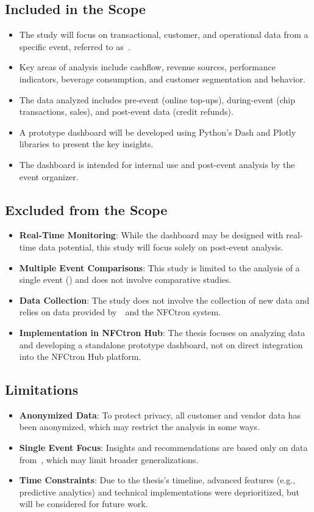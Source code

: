 \subsection*{Included in the Scope}
\label{subsec:introduction-scope-included}
\begin{itemize}
	\item The study will focus on transactional, customer, and operational data from a specific event, referred to as~\theEvent.
	\item Key areas of analysis include cashflow, revenue sources, performance indicators, beverage consumption, and customer segmentation and behavior.
	\item The data analyzed includes pre-event (\eg online top-ups), during-event (\eg chip transactions, sales), and post-event data (\eg credit refunds).
	\item A prototype dashboard will be developed using Python’s Dash and Plotly libraries to present the key insights.
	\item The dashboard is intended for internal use and post-event analysis by the event organizer.
\end{itemize}

\subsection*{Excluded from the Scope}
\label{subsec:introduction-scope-excluded}
\begin{itemize}
	\item \textbf{Real-Time Monitoring}: While the dashboard may be designed with real-time data potential, this study will focus solely on post-event analysis.
	\item \textbf{Multiple Event Comparisons}: This study is limited to the analysis of a single event (\theEvent) and does not involve comparative studies.
	\item \textbf{Data Collection}: The study does not involve the collection of new data and relies on data provided by~\theOrganizer~and the NFCtron system.
	\item \textbf{Implementation in NFCtron Hub}: The thesis focuses on analyzing data and developing a standalone prototype dashboard, not on direct integration into the NFCtron Hub platform.
\end{itemize}

\subsection*{Limitations}
\label{subsec:introduction-limitations}
\begin{itemize}
	\item \textbf{Anonymized Data}: To protect privacy, all customer and vendor data has been anonymized, which may restrict the analysis in some ways.
	\item \textbf{Single Event Focus}: Insights and recommendations are based only on data from~\theEvent, which may limit broader generalizations.
	\item \textbf{Time Constraints}: Due to the thesis's timeline, advanced features (e.g., predictive analytics) and technical implementations were deprioritized, but will be considered for future work.
\end{itemize}
